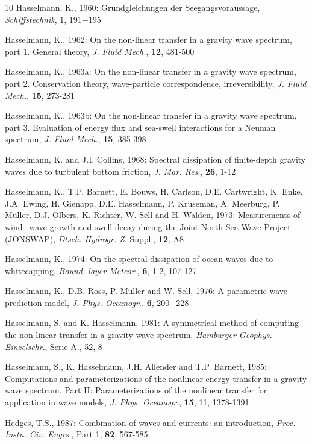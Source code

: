 \documentclass[12pt]{book}
\begin{document}
\begin{thebibliography}{10}
Hasselmann, K., 1960: Grundgleichungen der Seegangsvoraussage, {\it Schiffstechnik}, 1,  191$-$195

Hasselmann, K., 1962: On the non-linear transfer in a gravity wave spectrum, part 1. {G}eneral theory,
{\it J. Fluid Mech.}, {\bf 12}, 481-500

Hasselmann, K., 1963a: On the non-linear transfer in a gravity wave spectrum, part 2. {C}onservation theory,
wave-particle correspondence, irreversibility,
{\it J. Fluid Mech.}, {\bf 15}, 273-281

Hasselmann, K., 1963b: On the non-linear transfer in a gravity wave spectrum, part 3. {E}valuation of energy
flux and sea-swell interactions for a {N}euman spectrum,
{\it J. Fluid Mech.}, {\bf 15}, 385-398

Hasselmann, K. and J.I. Collins, 1968: Spectral dissipation of finite-depth gravity waves due to turbulent
bottom friction, {\it J. Mar. Res}., {\bf 26}, 1-12

Hasselmann, K., T.P. Barnett, E. Bouws, H. Carlson, D.E. Cartwright, K. Enke, J.A. Ewing, H. Gienapp,
D.E. Hasselmann, P. Kruseman, A. Meerburg, P. M\"{u}ller, D.J. Olbers, K. Richter, W. Sell and H.
Walden, 1973: Measurements of wind$-$wave growth and swell decay during the Joint North Sea
Wave Project (JONSWAP), {\it Dtsch. Hydrogr. Z}. Suppl., {\bf 12}, A8

Hasselmann, K., 1974: On the spectral dissipation of ocean waves due to whitecapping, {\it Bound.-layer
Meteor}., {\bf 6}, 1-2, 107-127

Hasselmann, K., D.B. Ross, P. M\"{u}ller and W. Sell, 1976: A parametric wave prediction  model, {\it J. Phys.
Oceanogr.}, {\bf 6}, 200$-$228

Hasselmann, S. and K. Hasselmann, 1981: A symmetrical method of computing the non-linear transfer
in a gravity-wave spectrum, {\it Hamburger Geophys. Einzelschr}., Serie A., 52, 8

Hasselmann, S., K. Hasselmann, J.H. Allender and T.P. Barnett, 1985: Computations and
parameterizations of the nonlinear energy transfer in a gravity wave spectrum. Part II:
Parameterizations of the nonlinear transfer for application in wave models, {\it J. Phys. Oceanogr}.,
{\bf 15}, 11, 1378-1391

Hedges, T.S., 1987: Combination of waves and currents: an introduction, {\it Proc. Instn. Civ. Engrs}., Part 1,
{\bf 82}, 567-585


\end{thebibliography}
\end{document}
